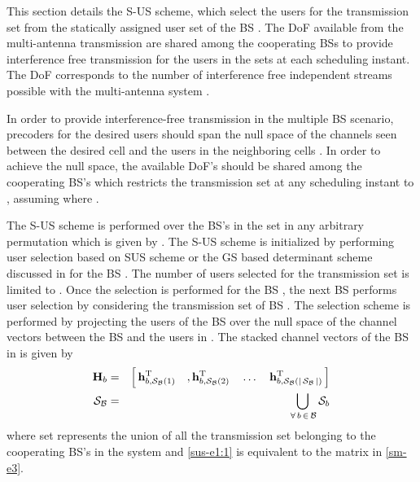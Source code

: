 
This section details the \ac{S-US} scheme, which select the users for the transmission set  from the statically assigned user set  of the BS . The \ac{DoF} available from the multi-antenna transmission are shared among the cooperating BSs to provide interference free transmission for the users in the sets  at each scheduling instant. The \ac{DoF} corresponds to the number of interference free independent streams possible with the multi-antenna system \cite{tse2005fundamentals}. 

In order to provide interference-free transmission in the multiple \ac{BS} scenario, precoders for the desired users should span the null space of the channels seen between the desired cell  and the users in the neighboring cells . In order to achieve the null space, the available \ac{DoF}'s should be shared among the cooperating \ac{BS}'s which restricts the transmission set  at any scheduling instant to , assuming  where .

The \ac{S-US} scheme is performed over the \ac{BS}'s in the set  in any arbitrary permutation which is given by . The \ac{S-US} scheme is initialized by performing user selection based on \ac{SUS} scheme \cite{sus2006zfbf} or the \ac{GS} based determinant scheme discussed in \cite{jin2010novel} for the \ac{BS} . The number of users selected for the transmission set  is limited to . Once the selection is performed for the \ac{BS} , the next \ac{BS}  performs user selection by considering the transmission set of \ac{BS} . The selection scheme is performed by projecting the users of the \ac{BS}  over the null space of the channel vectors between the BS  and the users in . The stacked channel vectors of the \ac{BS}  in  is given by
\begin{eqnarray}
\mbf{H}_b &=& \matscont{\mvecnxyz{h}{b}{\mc{S}_{\mc{B}}(1)}^\mrm{T} \quad, \mvecnxyz{h}{b}{\mc{S}_{\mc{B}}(2)}^\mrm{T} \quad \dotsc \quad \mvecnxyz{h}{b}{\mc{S}_{\mc{B}}(\card{\mc{S}_{\mc{B}}})}^\mrm{T} } \label{sus-e1:1}\\
\mc{S}_\mc{B} &=& \displaystyle \bigcup_{\fall b \inm \mc{B}} \mc{S}_b
\label{sus-e1}
\end{eqnarray}
where set  represents the union of all the transmission set belonging to the cooperating \ac{BS}'s in the system and \eqref{sus-e1:1} is equivalent to the matrix in \eqref{sm-e3}.

